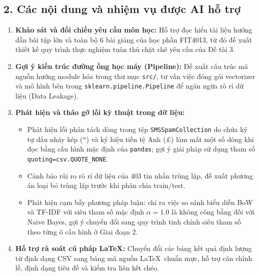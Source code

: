 \subsection*{2. Các nội dung và nhiệm vụ được AI hỗ trợ}
\begin{enumerate}
    \item \textbf{Khảo sát và đối chiếu yêu cầu môn học:} Hỗ trợ đọc hiểu tài liệu hướng dẫn bài tập lớn và toàn bộ 6 bài giảng của học phần FIT4013, từ đó đề xuất thiết kế quy trình thực nghiệm tuân thủ chặt chẽ yêu cầu của Đề tài 3.
    \item \textbf{Gợi ý kiến trúc đường ống học máy (Pipeline):} Đề xuất cấu trúc mã nguồn hướng module hóa trong thư mục \texttt{src/}, tư vấn việc đóng gói vectorizer và mô hình bên trong \texttt{sklearn.pipeline.Pipeline} để ngăn ngừa rò rỉ dữ liệu (Data Leakage).
    \item \textbf{Phát hiện và tháo gỡ lỗi kỹ thuật trong dữ liệu:}
    \begin{itemize}
        \item Phát hiện lỗi phân tách dòng trong tệp \texttt{SMSSpamCollection} do chứa ký tự dấu nháy kép (\texttt{"}) và ký hiệu tiền tệ Anh (£) làm mất một số dòng khi đọc bằng cấu hình mặc định của \texttt{pandas}; gợi ý giải pháp sử dụng tham số \texttt{quoting=csv.QUOTE\_NONE}.
        \item Cảnh báo rủi ro rò rỉ dữ liệu của 403 tin nhắn trùng lặp, đề xuất phương án loại bỏ trùng lặp trước khi phân chia train/test.
        \item Phát hiện cạm bẫy phương pháp luận: chỉ ra việc so sánh biểu diễn BoW và TF-IDF với siêu tham số mặc định $\alpha=1.0$ là không công bằng đối với Naive Bayes, gợi ý chuyển đổi sang quy trình tinh chỉnh siêu tham số theo từng ô cấu hình ở Giai đoạn 2.
    \end{itemize}
    \item \textbf{Hỗ trợ rà soát cú pháp \LaTeX:} Chuyển đổi các bảng kết quả định lượng từ định dạng CSV sang bảng mã nguồn \LaTeX\ chuẩn mực, hỗ trợ căn chỉnh lề, định dạng tiêu đề và kiểm tra liên kết chéo.
\end{enumerate}

